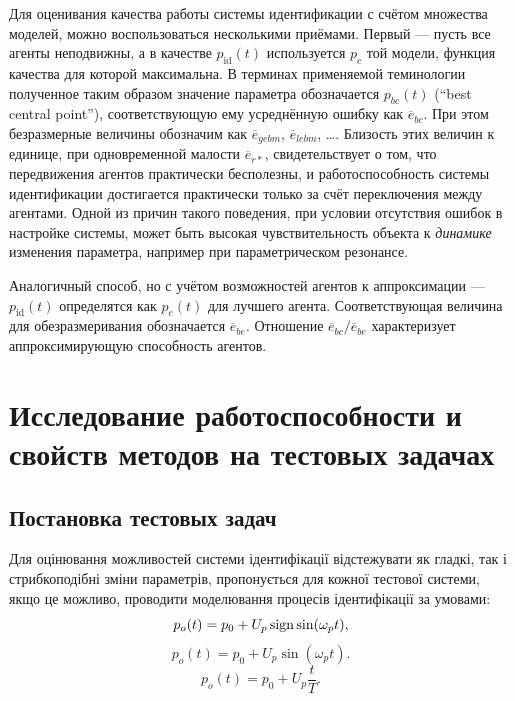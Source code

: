Для оценивания качества работы системы идентификации с счётом
множества моделей, можно воспользоваться несколькими приёмами.
Первый --- пусть все агенты неподвижны, а в качестве $p_\mathrm{id}(t)$
используется $p_c$ той модели, функция качества для которой
максимальна. В терминах применяемой теминологии полученное таким образом значение
параметра обозначается $p_{bc}(t)$ (``best central point''),
соответствующую ему усреднённую ошибку как $\overline{e}_{bc}$.
При этом безразмерные величины обозначим как
$\overline{e}_{gebm}$, $\overline{e}_{lebm}$,  \ldots.
Близость этих величин к единице, при одновременной малости
$\overline{e}_{r*}$, свидетельствует о том, что передвижения
агентов практически бесполезны, и работоспособность системы идентификации достигается
практически только за счёт переключения между агентами.
Одной из причин такого поведения, при условии отсутствия ошибок
в настройке системы, может быть высокая чувствительность
объекта к \textit{динамике} изменения параметра, например
при параметрическом резонансе.

Аналогичный способ, но с учётом возможностей агентов
к аппроксимации --- $p_\mathrm{id}(t)$ определятся
как $p_e(t)$ для лучшего агента.
Соответствующая величина для обезразмеривания обозначается
$\overline{e}_{be}$.
Отношение $\overline{e}_{bc} / \overline{e}_{be}$
характеризует аппроксимирующую способность агентов.






\section{Исследование работоспособности и свойств методов на тестовых задачах}  %

\subsection{Постановка тестовых задач}

Для оцінювання можливостей системи ідентифікації відстежувати як гладкі, так і
стрибкоподібні зміни параметрів, пропонується для кожної тестової системи, якщо
це можливо, проводити моделювання процесів ідентифікації за умовами:
%
\begin{equation}
  p_o(t) = p_0 +  U_{p} \operatorname*{sign} \sin( \omega_{p} t ),
  \label{atu:eq:po_t_sign}
\end{equation}
%
%
\begin{equation}
  p_o(t) = p_0 +  U_{p} \sin( \omega_{p} t ).
  \label{atu:eq:po_t_sin}
\end{equation}
%
\begin{equation}
  p_o(t) = p_0 +  U_{p} \frac{t}{T}.
  \label{atu:eq:po_t_ramp}
\end{equation}


